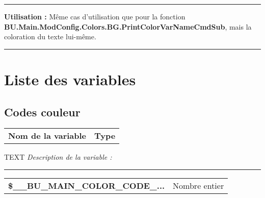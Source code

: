 \documentclass[a4paper,10pt]{article}
\begin{document}

\par\noindent\rule{\textwidth}{0.4pt}

\begin{justify}
    \textbf{Utilisation :} Même cas d'utilisation que pour la fonction \textbf{\color{func}BU.Main.ModConfig.Colors.BG.PrintColorVarNameCmdSub}, mais la coloration du texte lui-même.
\end{justify}








\color{sec1}\par\noindent\rule{\textwidth}{0.4pt}\color{text}

\color{sec1}
\section{Liste des variables}\color{text}

\color{sec2}
\subsection{Codes couleur}\color{text}

\begin{justify}
    \begin{tabular}{l|l}
        \textbf{Nom de la variable} & \textbf{Type}
    \end{tabular}
\end{justify}

\begin{justify}TEXT
    \textit{Description de la variable :}
\end{justify}


\par\noindent\rule{\textwidth}{0.4pt}

\begin{justify}
    \begin{tabular}{l|l}
        \textbf{\color{vars}\$\_\_BU\_MAIN\_COLOR\_CODE\_...}  & Nombre entier\\
    \end{tabular}
\end{justify}
\end{document}
